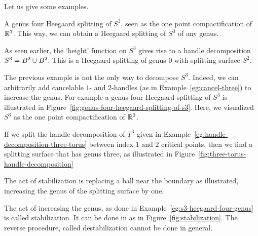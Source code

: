 Let us give some examples.
\begin{marginfigure}
    \centering
    \caption{A genus four Heegaard splitting of $S^{3}$, seen as the one point compactification of $\mathbb{R}^3$.
        This way, we can obtain a Heegaard splitting of $S^{3}$ of any genus.
    }
    \label{fig:genus-four-heegaard-splitting-of-s3}
\end{marginfigure}
\begin{eg}
    As seen earlier, the `height' function on $S^{3}$ gives rise to a handle decomposition $S^{3} = B^{2} \cup B^{2}$. This is a Heegaard splitting of genus $0$ with splitting surface $S^{2}$.
\end{eg}
\begin{eg}
    The previous example is not the only way to decompose $S^{3}$.
    Indeed, we can arbitrarily add cancelable $1$- and $2$-handles (as in Example~\ref{eg:cancel-three}) to increase the genus. 
    For example a genus four Heegaard splitting of $S^{3}$ is illustrated in Figure~\ref{fig:genus-four-heegaard-splitting-of-s3}.
    Here, we visualized $S^{3}$ as the one point compactification of $\mathbb{R}^3$.
    \label{eg:s3-heegaard-four-genus}
\end{eg}

\begin{eg}
    If we split the handle decomposition of $T^{3}$ given in Example~\ref{eg:handle-decomposition-three-torus} between index $1$ and $2$ critical points, then we find a splitting surface that has genus three, as illustrated in Figure~\ref{fig:three-torus-handle-decomposition}
\end{eg}

\begin{marginfigure}
    \centering
    \caption{
        The act of stabilization is replacing a ball near the boundary as illustrated, increasing the genus of the splitting surface by one.}
    \label{fig:stabilization}
\end{marginfigure}
\begin{remark}
    The act of increasing the genus, as done in Example~\ref{eg:s3-heegaard-four-genus} is called stabilization.
    It can be done in as in Figure~\ref{fig:stabilization}.
    The reverse procedure, called destabilization cannot be done in general.
\end{remark}

